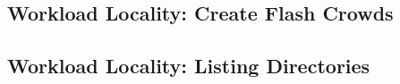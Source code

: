 \subsection{Workload Locality: Create Flash Crowds}

\subsection{Workload Locality: Listing Directories}
